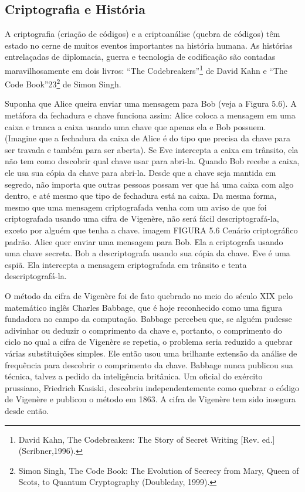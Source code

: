 \documentclass{book}
\begin{document}
\subsection{Criptografia e História}
\label{segredos:crip-his}

A criptografia (criação de códigos) e a criptoanálise (quebra de códigos) têm estado no cerne de muitos eventos importantes na história humana. As histórias entrelaçadas de diplomacia, guerra e tecnologia de codificação são contadas maravilhosamente em dois livros: ``The Codebreakers''\footnote{David Kahn, The Codebreakers: The Story of Secret Writing [Rev. ed.] (Scribner,1996).} de David Kahn e ``The Code Book''23\footnote{Simon Singh, The Code Book: The Evolution of Secrecy from Mary, Queen of Scots, to Quantum Cryptography (Doubleday, 1999).} de Simon Singh.

Suponha que Alice queira enviar uma mensagem para Bob (veja a Figura 5.6). A metáfora da fechadura e chave funciona assim: Alice coloca a mensagem em uma caixa e tranca a caixa usando uma chave que apenas ela e Bob possuem. (Imagine que a fechadura da caixa de Alice é do tipo que precisa da chave para ser travada e também para ser aberta). Se Eve intercepta a caixa em trânsito, ela não tem como descobrir qual chave usar para abri-la. Quando Bob recebe a caixa, ele usa sua cópia da chave para abri-la. Desde que a chave seja mantida em segredo, não importa que outras pessoas possam ver que há uma caixa com algo dentro, e até mesmo que tipo de fechadura está na caixa. Da mesma forma, mesmo que uma mensagem criptografada venha com um aviso de que foi criptografada usando uma cifra de Vigenère, não será fácil descriptografá-la, exceto por alguém que tenha a chave.
imagem
FIGURA 5.6 Cenário criptográfico padrão. Alice quer enviar uma mensagem para Bob. Ela a criptografa usando uma chave secreta. Bob a descriptografa usando sua cópia da chave. Eve é uma espiã. Ela intercepta a mensagem criptografada em trânsito e tenta descriptografá-la.

O método da cifra de Vigenère foi de fato quebrado no meio do século XIX pelo matemático inglês Charles Babbage, que é hoje reconhecido como uma figura fundadora no campo da computação. Babbage percebeu que, se alguém pudesse adivinhar ou deduzir o comprimento da chave e, portanto, o comprimento do ciclo no qual a cifra de Vigenère se repetia, o problema seria reduzido a quebrar várias substituições simples. Ele então usou uma brilhante extensão da análise de frequência para descobrir o comprimento da chave. Babbage nunca publicou sua técnica, talvez a pedido da inteligência britânica. Um oficial do exército prussiano, Friedrich Kasiski, descobriu independentemente como quebrar o código de Vigenère e publicou o método em 1863. A cifra de Vigenère tem sido insegura desde então.
\end{document}
